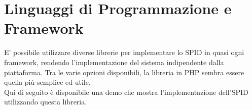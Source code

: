 \section{Linguaggi di Programmazione e Framework}
E' possibile utilizzare diverse librerie per implementare lo SPID in quasi ogni framework, rendendo l'implementazione del sistema 
indipendente dalla piattaforma. Tra le varie opzioni disponibili, la libreria in PHP sembra essere quella più semplice ed utile. \\
Qui di seguito è disponibile una demo che mostra l'implementazione dell'SPID utilizzando questa libreria.